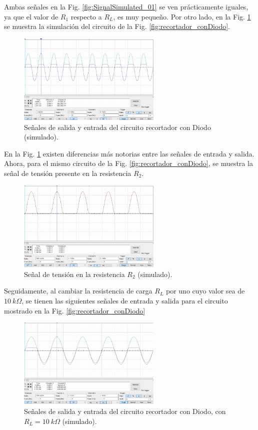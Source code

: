 \documentclass[journal]{IEEEtran}
\begin{document}
Ambas señales en la Fig. \ref{fig:SignalSimulated_01} se ven prácticamente iguales, ya que el valor de $R_1$ respecto a $R_L$, es muy pequeño. Por otro lado, en la Fig. \ref{fig:SignalSimulated_02} se muestra la simulación del circuito de la Fig. \ref{fig:recortador_conDiodo}.
\begin{figure}[H]
        \centering
        \includegraphics[width=2.7in]{SignalSimulated_02.png}
        \caption{Señales de salida y entrada del circuito recortador con Diodo (simulado).}
        \label{fig:SignalSimulated_02}
\end{figure}

En la Fig. \ref{fig:SignalSimulated_02} existen diferencias más notorias entre las señales de entrada y salida. Ahora, para el mismo circuito de la Fig. \ref{fig:recortador_conDiodo}, se muestra la señal de tensión presente en la resistencia $R_2$.

\begin{figure}[htbp]
        \centering
        \includegraphics[width=2.7in]{SignalSimulated_03.png}
        \caption{Señal de tensión en la resistencia $R_2$ (simulado).}
        \label{fig:SignalSimulated_03}
\end{figure}

Seguidamente, al cambiar la resistencia de carga $R_L$ por uno cuyo valor sea de $10~k\Omega$, se tienen las siguientes señales de entrada y salida para el circuito mostrado en la Fig. \ref{fig:recortador_conDiodo}
\begin{figure}[htbp]
        \centering
        \includegraphics[width=2.7in]{SignalSimulated_04.png}
        \caption{Señales de salida y entrada del circuito recortador con Diodo, con $R_L=10~k\Omega$ (simulado).}
        \label{fig:SignalSimulated_04}
\end{figure}
\end{document}
